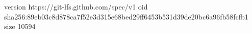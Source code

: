 version https://git-lfs.github.com/spec/v1
oid sha256:89eb03c8d878ca7f52e3d315e68bed29ff6453b531d39de20bc6a96fb58fcfb1
size 10594
